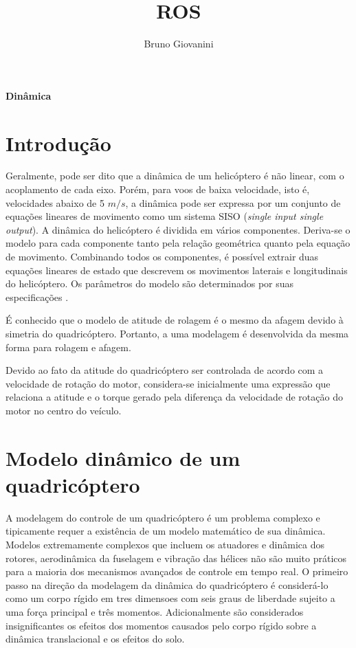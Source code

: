 \documentclass[a4paper, 12pt]{article}
\author{Bruno Giovanini}
\title{ROS}
\begin{document}
\begin{large}


\textbf{Dinâmica}

\vspace{1.5cm}


\end{large}



\newpage


\section{Introdução}

Geralmente, pode ser dito que a dinâmica de um helicóptero é não linear, com o acoplamento de cada eixo. Porém, para voos de baixa velocidade, isto é, velocidades abaixo de 5 $m/s$, a dinâmica pode ser expressa por um conjunto de equações lineares de movimento como um sistema SISO (\textit{single input single output}). A dinâmica do helicóptero é dividida em vários componentes. Deriva-se o modelo para cada componente tanto pela relação geométrica quanto pela equação de movimento. Combinando todos os componentes, é possível extrair duas equações lineares de estado que descrevem os movimentos laterais e longitudinais do helicóptero. Os parâmetros do modelo são determinados por suas especificações \cite{Nonami2010}.

É conhecido que o modelo de atitude de rolagem é o mesmo da afagem devido à simetria do quadricóptero. Portanto, a uma modelagem é desenvolvida da mesma forma para rolagem e afagem.

Devido ao fato da atitude do quadricóptero ser controlada de acordo com a velocidade de rotação do motor, considera-se inicialmente uma expressão que relaciona a atitude e o torque gerado pela diferença da velocidade de rotação do motor no centro do veículo.

\section{Modelo dinâmico de um quadricóptero}

A modelagem do controle de um quadricóptero é um problema complexo e tipicamente requer a existência de um modelo matemático de sua dinâmica. Modelos extremamente complexos que incluem os atuadores e dinâmica dos rotores, aerodinâmica da fuselagem e vibração das hélices não são muito práticos para a maioria dos mecanismos avançados de controle em tempo real. O primeiro passo na direção da modelagem da dinâmica do quadricóptero é considerá-lo como um corpo rígido em tres dimensoes com seis graus de liberdade sujeito a uma força principal e três momentos. Adicionalmente são considerados insignificantes os efeitos dos momentos causados pelo corpo rígido sobre a dinâmica translacional e os efeitos do solo.  
\end{document}
